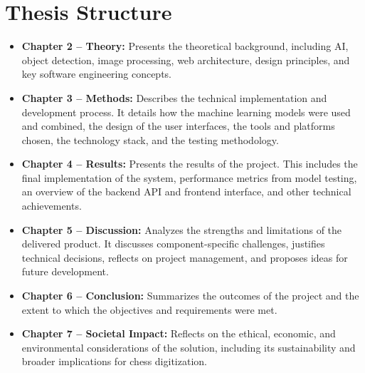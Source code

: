 \section{Thesis Structure}

\begin{itemize}
    
    \item \textbf{Chapter 2 -- Theory:} Presents the theoretical background, including AI, object detection, image processing, web architecture, design principles, and key software engineering concepts.
    
    \item \textbf{Chapter 3 -- Methods:} Describes the technical implementation and development process. It details how the machine learning models were used and combined, the design of the user interfaces, the tools and platforms chosen, the technology stack, and the testing methodology.
    
    \item \textbf{Chapter 4 -- Results:} Presents the results of the project. This includes the final implementation of the system, performance metrics from model testing, an overview of the backend API and frontend interface, and other technical achievements.
    
    \item \textbf{Chapter 5 -- Discussion:} Analyzes the strengths and limitations of the delivered product. It discusses component-specific challenges, justifies technical decisions, reflects on project management, and proposes ideas for future development.
    
    \item \textbf{Chapter 6 -- Conclusion:} Summarizes the outcomes of the project and the extent to which the objectives and requirements were met.

    \item \textbf{Chapter 7 -- Societal Impact:} Reflects on the ethical, economic, and environmental considerations of the solution, including its sustainability and broader implications for chess digitization.
    
\end{itemize}